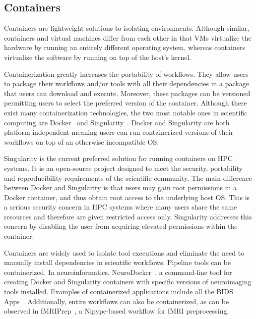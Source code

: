        \subsection{Containers}

            Containers are lightweight solutions to isolating environments.
            Although similar, containers and virtual machines differ from each
            other in that VMs virtualize the hardware by running an entirely
            different operating system, whereas containers virtualize the
            software by running on top of the host's kernel. 
        
            Containerization greatly increases the portability of workflows.
            They allow users to package their workflows and/or tools with all
            their dependencies in a package that users can download and execute.
            Moreover, these packages can be versioned permitting users to select
            the preferred version of the container. Although there exist many
            containerization technologies, the two most notable ones in
            scientific computing are Docker~\cite{merkel2014docker} and
            Singularity~\cite{10.1371/journal.pone.0177459}. Docker and
            Singularity are both platform independent meaning users can run
            containerized versions of their workflows on top of an otherwise
            incompatible OS.

            Singularity is the current preferred solution for running containers
            on HPC systems. It is an open-source project designed to meet the
            security, portability and reproducibility requirements of the
            scientific community. The main difference between Docker and
            Singularity is that users may gain root permissions in a Docker
            container, and thus obtain root access to the underlying host OS.
            This is a serious security concern in HPC systems where many users
            share the same resources and therefore are given restricted access
            only. Singularity addresses this concern by disabling the user from
            acquiring elevated permissions within the container. 

            Containers are widely used to isolate tool executions and eliminate
            the need to manually install dependencies in scientific workflows.
            Pipeline tools can be containerized. In neuroinformatics,
            NeuroDocker~\cite{neurodoc}, a command-line tool for creating Docker
            and Singularity containers with specific versions of neuroimaging
            tools installed. Examples of containerized applications include all
            the BIDS Apps~\cite{10.1371/journal.pcbi.1005209}. Additionally,
            entire workflows can also be containerized, as can be observed in
            fMRIPrep~\cite{Esteban306951}, a Nipype-based workflow for fMRI
            preprocessing.
            
